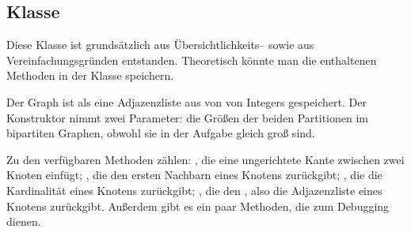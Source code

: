\subsection{Klasse }
Diese Klasse ist grundsätzlich aus Übersichtlichkeits--  sowie aus Vereinfachungsgründen
entstanden. Theoretisch könnte man die enthaltenen Methoden in der Klasse  
speichern.

Der Graph ist als eine Adjazenzliste aus  von  von Integers gespeichert.
Der Konstruktor nimmt zwei Parameter: die Größen der beiden Partitionen
im bipartiten Graphen, obwohl sie in der Aufgabe gleich groß sind.

Zu den verfügbaren Methoden zählen: ,
die eine ungerichtete Kante zwischen zwei Knoten einfügt; , die den ersten Nachbarn eines Knotens zurückgibt; , die die Kardinalität
eines Knotens zurückgibt; , die den , also die Adjazenzliste
eines Knotens zurückgibt. Außerdem gibt es ein paar Methoden, die zum Debugging dienen. 
